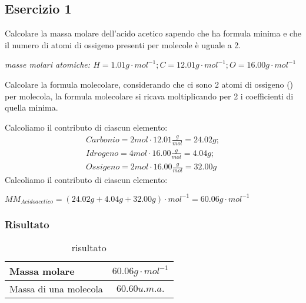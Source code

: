 \documentclass{book}
\begin{document}
\subsection{Esercizio 1}
\label{sec:esMolEnumDiMol1}

Calcolare la massa molare dell'acido acetico sapendo che ha formula minima  e che il numero di atomi di
ossigeno presenti per molecole è uguale a 2.
\begin{center}
  \textit{masse molari atomiche: $H=1.01g\cdot mol^{-1};C=12.01g\cdot mol^{-1};O=16.00g\cdot mol^{-1}$}
\end{center}
\begin{tasks}
  \task Calcolare la formula molecolare, considerando che ci sono 2 atomi di ossigeno () per molecola, la
  formula molecolare si ricava moltiplicando per 2 i coefficienti di quella minima.
  \begin{center}
  \end{center}
  \task Calcoliamo il contributo di ciascun elemento:
  \begin{eqnarray*}
    Carbonio=2mol\cdot 12.01\frac{g}{mol}=24.02g;\\
    Idrogeno=4mol\cdot 16.00\frac{g}{mol}=4.04g;\\
    Ossigeno=2mol\cdot 16.00\frac{g}{mol}=32.00g
  \end{eqnarray*}
  \task Calcoliamo il contributo di ciascun elemento:
  \begin{center}
    $MM_{Acido acetico}=(24.02g+4.04g+32.00g)\cdot mol^{-1}=60.06g\cdot mol^{-1}$
  \end{center}
\end{tasks}
\clearpage
\subsubsection{Risultato}
\label{sec:esMolEnumDiMolris1}

\begin{table}[ht!]
  \centering
  \begin{tabular}{lc}
    Massa molare & $60.06g\cdot mol^{-1}$\\\hline
    Massa di una molecola & $60.60 u.m.a.$\\\hline
  \end{tabular}
  \caption{risultato}
  \label{tab:risesmol1}
\end{table}
\end{document}
